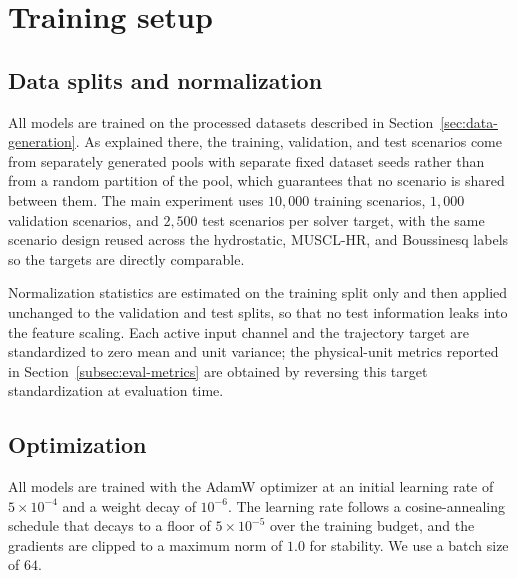 \section{Training setup}
\label{sec:training}

\subsection{Data splits and normalization}
\label{subsec:train-splits}
All models are trained on the processed datasets described in Section~\ref{sec:data-generation}. As explained there, the training, validation, and test scenarios come from separately generated pools with separate fixed dataset seeds rather than from a random partition of the pool, which guarantees that no scenario is shared between them. The main experiment uses $10{,}000$ training scenarios, $1{,}000$ validation scenarios, and $2{,}500$ test scenarios per solver target, with the same scenario design reused across the hydrostatic, MUSCL-HR, and Boussinesq labels so the targets are directly comparable.

Normalization statistics are estimated on the training split only and then applied unchanged to the validation and test splits, so that no test information leaks into the feature scaling. Each active input channel and the trajectory target are standardized to zero mean and unit variance; the physical-unit metrics reported in Section~\ref{subsec:eval-metrics} are obtained by reversing this target standardization at evaluation time.

\subsection{Optimization}
\label{subsec:train-optim}
All models are trained with the AdamW optimizer at an initial learning rate of $5 \times 10 ^ {-4}$ and a weight decay of $10 ^ {-6}$. The learning rate follows a cosine-annealing schedule that decays to a floor of $5 \times 10 ^ {-5}$ over the training budget, and the gradients are clipped to a maximum norm of $1.0$ for stability. We use a batch size of $64$.

